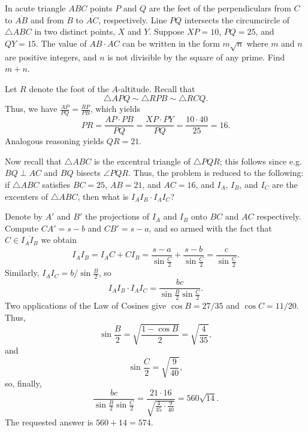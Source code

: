 \begin{question}[name={2019 AIME II, \href{https://artofproblemsolving.com/community/c4p12030181}{Problem 15}}]
	In acute triangle $ABC$ points $P$ and $Q$ are the feet of the perpendiculars from $C$ to $\overline{AB}$ and from $B$ to $\overline{AC}$, respectively. Line $PQ$ intersects the circumcircle of $\triangle ABC$ in two distinct points, $X$ and $Y$. Suppose $XP=10$, $PQ=25$, and $QY=15$. The value of $AB\cdot AC$ can be written in the form $m\sqrt n$ where $m$ and $n$ are positive integers, and $n$ is not divisible by the square of any prime. Find $m+n$.
\end{question}


\begin{solution}[name={Solution by Michael Tang}]
	Let $R$ denote the foot of the $A$-altitude. Recall that\[\triangle APQ\sim\triangle RPB\sim\triangle RCQ.\]Thus, we have $\tfrac{AP}{PQ} = \tfrac{RP}{PB}$, which yields
	\[PR = \dfrac{AP\cdot PB}{PQ} = \dfrac{XP\cdot PY}{PQ} = \dfrac{10\cdot 40}{25} =16.\]Analogous reasoning yields $QR=21$.
	
	Now recall that $\triangle ABC$ is the excentral triangle of $\triangle PQR$; this follows since e.g. $BQ\perp AC$ and $BQ$ bisects $\angle PQR$. Thus, the problem is reduced to the following: if $\triangle ABC$ satisfies $BC=25$, $AB=21$, and $AC=16$, and $I_A$, $I_B$, and $I_C$ are the excenters of $\triangle ABC$, then what is $I_AI_B\cdot I_AI_C$?
	
	Denote by $A'$ and $B'$ the projections of $I_A$ and $I_B$ onto $BC$ and $AC$ respectively. Compute $CA'=s-b$ and $CB' = s-a$, and so armed with the fact that $C\in\overline{I_AI_B}$ we obtain\[I_AI_B = I_AC+CI_B = \dfrac{s-a}{\sin\frac C2} + \dfrac{s-b}{\sin\frac C2} = \dfrac{c}{\sin\frac C2}.\]
	Similarly, $I_AI_C = {b}/{\sin \frac B2}$, so\[I_AI_B\cdot I_AI_C = \dfrac{bc}{\sin\frac B2\sin\frac C2}.\]Two applications of the Law of Cosines give $\cos B = {27}/{35}$ and $\cos C = {11}/{20}$. Thus, $$\sin\frac B2 = \sqrt{\frac{1-\cos B}2} = \sqrt{\frac{4}{35}},$$ and $$\sin\frac C2 = \sqrt{\frac{9}{40}},$$ so, finally, 
	\[\frac{bc}{\sin\frac B2\sin\frac C2} = \frac{21\cdot 16}{\sqrt{\frac{4}{35}\cdot\frac{9}{40}}} = 560\sqrt{14}.\]The requested answer is $560+14=\boxed{574}$.
\end{solution}












